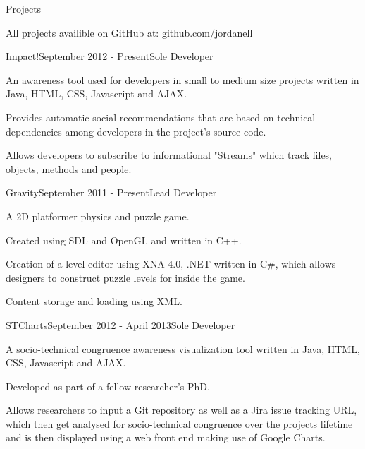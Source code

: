 \documentclass{resume} %
\begin{document}
\begin{rSection}{Projects}

All projects availible on GitHub at: github.com/jordanell

\begin{rSubsection}{Impact!}{September 2012 - Present}{Sole Developer}{}
\item An awareness tool used for developers in small to medium size projects written in Java, HTML, CSS, Javascript and AJAX.
\item Provides automatic social recommendations that are based on technical dependencies among developers in the project's source code.
\item Allows developers to subscribe to informational "Streams" which track files, objects, methods and people.
\end{rSubsection}

\begin{rSubsection}{Gravity}{September 2011 - Present}{Lead Developer}{}
\item A 2D platformer physics and puzzle game.
\item Created using SDL and OpenGL and written in C++. 
\item Creation of a level editor using XNA 4.0, .NET written in C\#, which allows designers to construct puzzle levels for inside the game.
\item Content storage and loading using XML.
\end{rSubsection}

\begin{rSubsection}{STCharts}{September 2012 - April 2013}{Sole Developer}{}
\item A socio-technical congruence awareness visualization tool written in Java, HTML, CSS, Javascript and AJAX.
\item Developed as part of a fellow researcher's PhD.
\item Allows researchers to input a Git repository as well as a Jira issue tracking URL, which then get analysed for socio-technical congruence over the projects lifetime and is then
displayed using a web front end making use of Google Charts.
\end{rSubsection}

\end{rSection}

\end{document}
